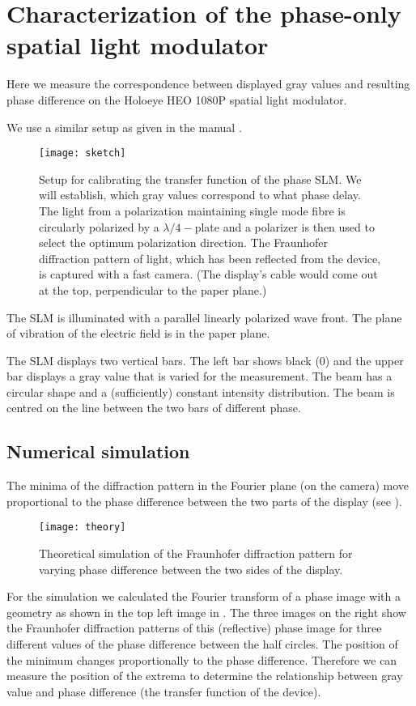 \section{ Characterization of the phase-only spatial light modulator}
\begin{summary}
  Here we measure the correspondence between displayed gray values and
  resulting phase difference on the Holoeye HEO 1080P spatial light
  modulator.
\end{summary}
We use a similar setup as given in the manual \citep{Holoeye2006}.
\begin{figure}[!hbt]
  \centering
  \texttt{[image: sketch]}
  \caption{Setup for calibrating the transfer function of the phase
    SLM. We will establish, which gray values correspond to what phase
    delay. The light from a polarization maintaining single mode fibre
    is circularly polarized by a $\lambda/4-$plate and a polarizer is
    then used to select the optimum polarization direction. The
    Fraunhofer diffraction pattern of light, which has been reflected
    from the device, is captured with a fast camera. (The display's
    cable would come out at the top, perpendicular to the paper
    plane.)}
  \label{fig:holo-calib}
\end{figure}
The SLM is illuminated with a parallel linearly polarized wave
front. The plane of vibration of the electric field is in the paper
plane.

The SLM displays two vertical bars. The left bar shows black (0) and
the upper bar displays a gray value that is varied for the
measurement.  The beam has a circular shape and a (sufficiently)
constant intensity distribution. The beam is centred on the line
between the two bars of different phase. 
\subsection{Numerical simulation}
The minima of the diffraction pattern in the Fourier plane (on the
camera) move proportional to the phase difference between the two
parts of the display (see ).
\begin{figure}[!hbt]
  \centering
  \texttt{[image: theory]}
  \caption{Theoretical simulation of the Fraunhofer diffraction
    pattern for varying phase difference between the two sides of the
    display.}
  \label{fig:holo-theory}
\end{figure}
For the simulation we calculated the Fourier transform of a phase
image with a geometry as shown in the top left image in
.  The three images on the right show the
Fraunhofer diffraction patterns of this (reflective) phase image for
three different values of the phase difference between the half
circles. The position of the minimum changes proportionally to the
phase difference. Therefore we can measure the position of the extrema
to determine the relationship between gray value and phase difference
(the transfer function of the device).

